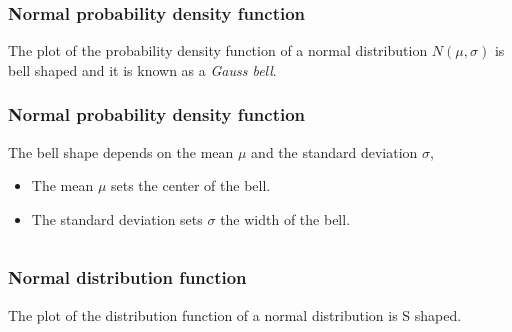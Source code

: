 \begin{frame}
\frametitle{Normal probability density function}
The plot of the probability density function of a normal distribution $N(\mu,\sigma)$ is bell shaped and it is known as
a \emph{Gauss bell}.
\begin{center}
\end{center}
\end{frame}


\begin{frame}
\frametitle{Normal probability density function}
The bell shape depends on the mean $\mu$ and the standard deviation $\sigma$,
\begin{itemize}
\item The mean $\mu$ sets the center of the bell.
\item The standard deviation sets $\sigma$ the width of the bell.
\end{itemize}
\medskip
\begin{columns}
\begin{column}{0.47\textwidth}

\end{column}
\begin{column}{0.47\textwidth}
\end{column}
\end{columns}
\end{frame}


\begin{frame}
\frametitle{Normal distribution function}
The plot of the distribution function of a normal distribution is S shaped. 
\begin{center}
\end{center}
\end{frame}



